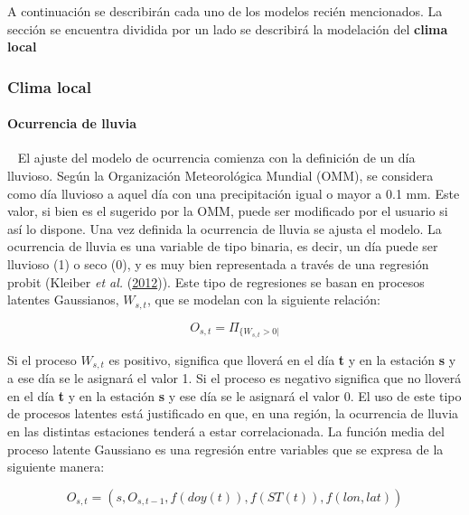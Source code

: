\documentclass[
  12pt]{article}
\begin{document}
A continuación se describirán cada uno de los modelos recién mencionados. La sección se encuentra dividida por un lado se describirá la modelación del \textbf{clima local}

\hypertarget{clima-local}{%
\subsubsection{Clima local}\label{clima-local}}

\hypertarget{ocurrencia-de-lluvia}{%
\paragraph{Ocurrencia de lluvia}\label{ocurrencia-de-lluvia}}

~
El ajuste del modelo de ocurrencia comienza con la definición de un día lluvioso. Según la Organización Meteorológica Mundial (OMM), se considera como día lluvioso a aquel día con una precipitación igual o mayor a 0.1 mm. Este valor, si bien es el sugerido por la OMM, puede ser modificado por el usuario si así lo dispone. Una vez definida la ocurrencia de lluvia se ajusta el modelo. La ocurrencia de lluvia es una variable de tipo binaria, es decir, un día puede ser lluvioso (1) o seco (0), y es muy bien representada a través de una regresión probit (Kleiber \emph{et al.} (\protect\hyperlink{ref-RN3539}{2012})). Este tipo de regresiones se basan en procesos latentes Gaussianos, \(W_{s,t}\), que se modelan con la siguiente relación:

\[
O_{s,t} = \Pi_{\{W_{s,t} > 0|} 
\]

Si el proceso \(W_{s,t}\) es positivo, significa que lloverá en el día \textbf{t} y en la estación \textbf{s} y a ese día se le asignará el valor 1. Si el proceso es negativo significa que no lloverá en el día \textbf{t} y en la estación \textbf{s} y ese día se le asignará el valor 0. El uso de este tipo de procesos latentes está justificado en que, en una región, la ocurrencia de lluvia en las distintas estaciones tenderá a estar correlacionada. La función media del proceso latente Gaussiano es una regresión entre variables que se expresa de la siguiente manera:

\[
O_{s,t} = (s, O_{s,t-1}, f(doy(t)), f(ST(t)), f(lon, lat))
\]
\end{document}
